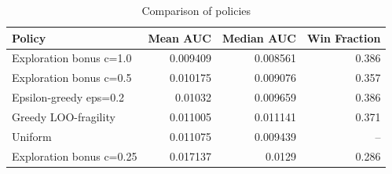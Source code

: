 \begin{table}[htbp]
\centering
\small
\caption{Comparison of policies}
\label{tab:main-policy-comparison}
\begin{tabularx}{\textwidth}{Xrrr}
\toprule
Policy & Mean AUC & Median AUC & Win Fraction \\
\midrule
Exploration bonus c=1.0 & 0.009409 & 0.008561 & 0.386 \\
Exploration bonus c=0.5 & 0.010175 & 0.009076 & 0.357 \\
Epsilon-greedy eps=0.2 & 0.01032 & 0.009659 & 0.386 \\
Greedy LOO-fragility & 0.011005 & 0.011141 & 0.371 \\
Uniform & 0.011075 & 0.009439 & -- \\
Exploration bonus c=0.25 & 0.017137 & 0.0129 & 0.286 \\
\bottomrule
\end{tabularx}
\end{table}